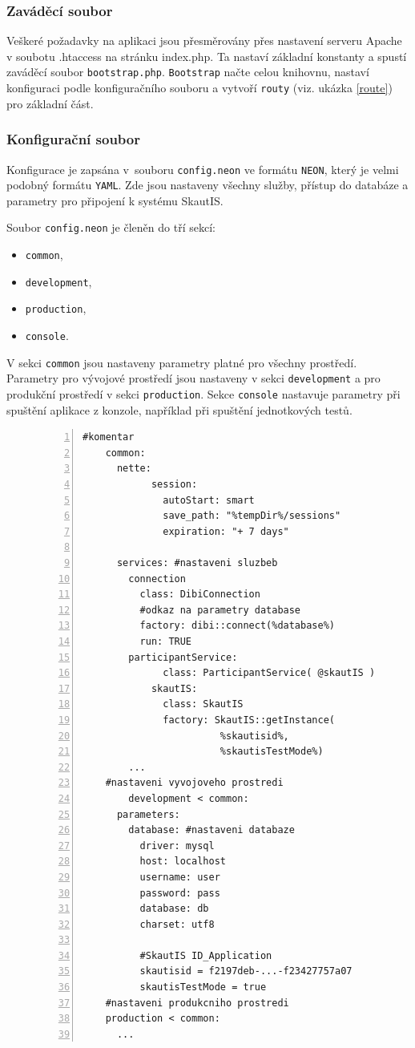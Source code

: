 \documentclass[thesis=B,czech]{FITthesis}[2011/06/14]
\begin{document}
\subsubsection{Zaváděcí soubor}
Veškeré požadavky na aplikaci jsou přesměrovány přes nastavení serveru Apache v soubotu .htaccess na stránku index.php. Ta nastaví základní konstanty a spustí zaváděcí soubor \texttt{bootstrap.php}.
\texttt{Bootstrap} načte celou knihovnu, nastaví konfiguraci podle konfiguračního souboru a vytvoří \texttt{routy} (viz. ukázka \ref{route}) pro základní část.

\subsubsection{Konfigurační soubor}
Konfigurace je zapsána v~souboru \texttt{config.neon} ve formátu \texttt{NEON}\cite{neon}, který je velmi podobný formátu \texttt{YAML}. Zde jsou nastaveny všechny služby, přístup do databáze a parametry pro připojení k systému SkautIS.

Soubor \texttt{config.neon} je členěn do tří sekcí:

\begin{itemize}
	\item \texttt{common},
	\item \texttt{development},
	\item \texttt{production},
	\item \texttt{console}.
\end{itemize}

V sekci \texttt{common} jsou nastaveny parametry platné pro všechny prostředí. Parametry pro vývojové prostředí jsou nastaveny v sekci \texttt{development} a pro produkční prostředí v sekci \texttt{production}. Sekce \texttt{console} nastavuje parametry při spuštění aplikace z konzole, například při spuštění jednotkových testů.

\begin{figure}
\begin{lstlisting}[caption=ukázka z konfiguračního souboru config.neon, numbers=left, label=configneon]
	#komentar
	common:
	  nette:
            session:
              autoStart: smart
              save_path: "%tempDir%/sessions"
              expiration: "+ 7 days"
           
	  services: #nastaveni sluzbeb
	    connection
	      class: DibiConnection
	      #odkaz na parametry database
	      factory: dibi::connect(%database%)
	      run: TRUE
	    participantService:
              class: ParticipantService( @skautIS )
            skautIS:
              class: SkautIS
              factory: SkautIS::getInstance(
              			%skautisid%,
              			%skautisTestMode%)
	    ...
	#nastaveni vyvojoveho prostredi
        development < common:	
	  parameters:
	    database: #nastaveni databaze
	      driver: mysql
	      host: localhost
	      username: user
	      password: pass
	      database: db
	      charset: utf8
	
	      #SkautIS ID_Application
	      skautisid = f2197deb-...-f23427757a07
	      skautisTestMode = true
	#nastaveni produkcniho prostredi
	production < common:
	  ...
\end{lstlisting}
\end{figure}
\end{document}
